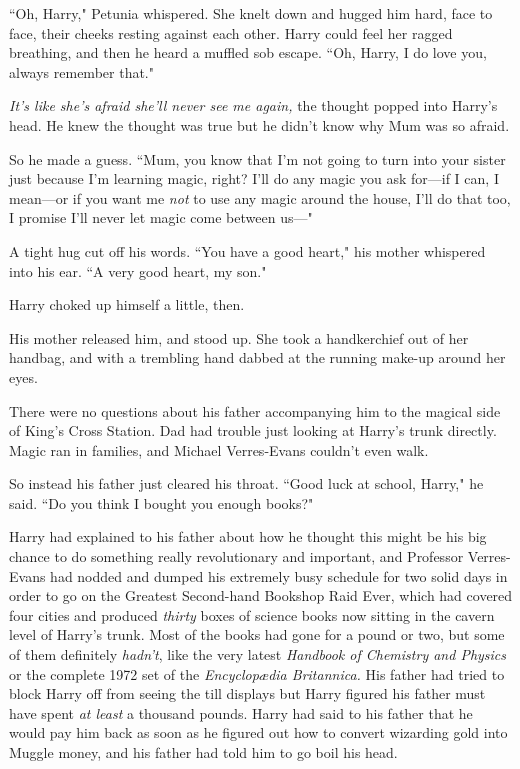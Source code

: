 ``Oh, Harry," Petunia whispered. She knelt down and hugged him hard, face to face, their cheeks resting against each other. Harry could feel her ragged breathing, and then he heard a muffled sob escape. ``Oh, Harry, I do love you, always remember that."

\emph{It's like she's afraid she'll never see me again,} the thought popped into Harry's head. He knew the thought was true but he didn't know why Mum was so afraid.

So he made a guess. ``Mum, you know that I'm not going to turn into your sister just because I'm learning magic, right? I'll do any magic you ask for—if I can, I mean—or if you want me \emph{not} to use any magic around the house, I'll do that too, I promise I'll never let magic come between us—"

A tight hug cut off his words. ``You have a good heart," his mother whispered into his ear. ``A very good heart, my son."

Harry choked up himself a little, then.

His mother released him, and stood up. She took a handkerchief out of her handbag, and with a trembling hand dabbed at the running make-up around her eyes.

There were no questions about his father accompanying him to the magical side of King's Cross Station. Dad had trouble just looking at Harry's trunk directly. Magic ran in families, and Michael Verres-Evans couldn't even walk.

So instead his father just cleared his throat. ``Good luck at school, Harry," he said. ``Do you think I bought you enough books?"

Harry had explained to his father about how he thought this might be his big chance to do something really revolutionary and important, and Professor Verres-Evans had nodded and dumped his extremely busy schedule for two solid days in order to go on the Greatest Second-hand Bookshop Raid Ever, which had covered four cities and produced \emph{thirty} boxes of science books now sitting in the cavern level of Harry's trunk. Most of the books had gone for a pound or two, but some of them definitely \emph{hadn't}, like the very latest \emph{Handbook of Chemistry and Physics} or the complete 1972 set of the \emph{Encyclopædia Britannica.} His father had tried to block Harry off from seeing the till displays but Harry figured his father must have spent \emph{at least} a thousand pounds. Harry had said to his father that he would pay him back as soon as he figured out how to convert wizarding gold into Muggle money, and his father had told him to go boil his head.

